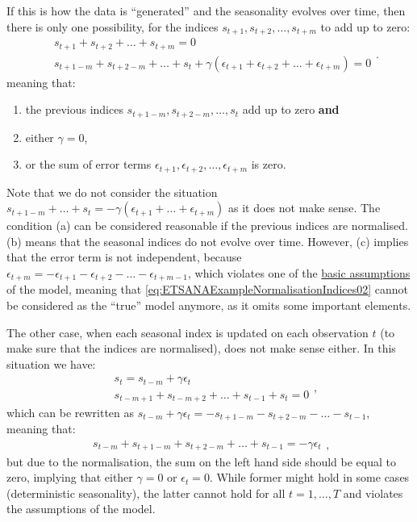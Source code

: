 \documentclass[
]{book}
\providecommand{\tightlist}{%
  \setlength{\itemsep}{0pt}\setlength{\parskip}{0pt}}
\theoremstyle{definition}
\theoremstyle{definition}
\theoremstyle{definition}
\theoremstyle{definition}
\theoremstyle{remark}
\begin{document}
If this is how the data is ``generated'' and the seasonality evolves over time, then there is only one possibility, for the indices \(s_{t+1}, s_{t+2}, \dots, s_{t+m}\) to add up to zero:
\begin{equation}
  \begin{aligned}
  &s_{t+1}+ s_{t+2}+ \dots+ s_{t+m} = 0 \\
  &s_{t+1-m}+ s_{t+2-m}+ \dots+ s_{t} + \gamma \left(\epsilon_{t+1}+ \epsilon_{t+2}+ \dots+ \epsilon_{t+m}\right) = 0
  \end{aligned}.
  \label{eq:ETSANAExampleNormalisationIndices02}
\end{equation}
meaning that:

\begin{enumerate}
\def\labelenumi{\alph{enumi}.}
\tightlist
\item
  the previous indices \(s_{t+1-m}, s_{t+2-m}, \dots, s_{t}\) add up to zero \textbf{and}
\item
  either \(\gamma=0\),
\item
  or the sum of error terms \(\epsilon_{t+1}, \epsilon_{t+2}, \dots, \epsilon_{t+m}\) is zero.
\end{enumerate}

Note that we do not consider the situation \(s_{t+1-m}+ \dots+ s_{t} = - \gamma \left(\epsilon_{t+1}+ \dots+ \epsilon_{t+m}\right)\) as it does not make sense. The condition (a) can be considered reasonable if the previous indices are normalised. (b) means that the seasonal indices do not evolve over time. However, (c) implies that the error term is not independent, because \(\epsilon_{t+m} = -\epsilon_{t+1}- \epsilon_{t+2}- \dots- \epsilon_{t+m-1}\), which violates one of the \protect\hyperlink{assumptions}{basic assumptions} of the model, meaning that \eqref{eq:ETSANAExampleNormalisationIndices02} cannot be considered as the ``true'' model anymore, as it omits some important elements.

The other case, when each seasonal index is updated on each observation \(t\) (to make sure that the indices are normalised), does not make sense either. In this situation we have:
\begin{equation}
  \begin{aligned}
  &s_t = s_{t-m} + \gamma\epsilon_t \\
  &s_{t-m+1}+ s_{t-m+2}+ \dots+ s_{t-1} + s_{t} = 0
  \end{aligned},
  \label{eq:ETSANAExampleNormalisationIndices03}
\end{equation}
which can be rewritten as \(s_{t-m} + \gamma\epsilon_t = -s_{t+1-m}- s_{t+2-m}- \dots- s_{t-1}\), meaning that:
\begin{equation}
  \begin{aligned}
  s_{t-m}+ s_{t+1-m}+ s_{t+2-m}+ \dots+ s_{t-1} = -\gamma\epsilon_t
  \end{aligned},
  \label{eq:ETSANAExampleNormalisationIndices03}
\end{equation}
but due to the normalisation, the sum on the left hand side should be equal to zero, implying that either \(\gamma=0\) or \(\epsilon_t=0\). While former might hold in some cases (deterministic seasonality), the latter cannot hold for all \(t=1,\dots,T\) and violates the assumptions of the model.
\end{document}
